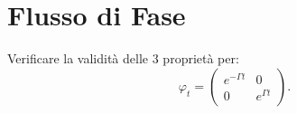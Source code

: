 \section{Flusso di Fase}%
\begin{ex}
    Verificare la validità delle 3 proprietà per:
    \[
        \varphi_t = 
	\begin{pmatrix} 
	    e^{-\Gamma t} & 0 \\
	    0 & e^{\Gamma t} 
        \end{pmatrix} 
    .\] 
\end{ex}
\noindent
